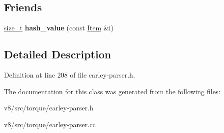 \subsection*{Friends}
\begin{DoxyCompactItemize}
\item 
\mbox{\label{classv8_1_1internal_1_1torque_1_1Item_a0b09f2dabc69dd49b9efa18b8744d1cd}} 
\mbox{\hyperlink{classsize__t}{size\+\_\+t}} {\bfseries hash\+\_\+value} (const \mbox{\hyperlink{classv8_1_1internal_1_1torque_1_1Item}{Item}} \&i)
\end{DoxyCompactItemize}


\subsection{Detailed Description}


Definition at line 208 of file earley-\/parser.\+h.



The documentation for this class was generated from the following files\+:\begin{DoxyCompactItemize}
\item 
v8/src/torque/earley-\/parser.\+h\item 
v8/src/torque/earley-\/parser.\+cc\end{DoxyCompactItemize}
